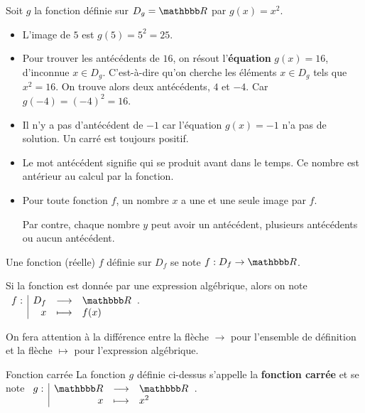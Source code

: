 \documentclass[10pt,a4paper,openany,twoside,prof]{book}
\begin{document}
\begin{ex}{}{}
    Soit $g$ la fonction définie sur $D_g=\R$ par $g(x)=x^2$.
    \begin{itemize}
        \item  L'image de $5$ est $g(5)=5^2=25$.
        \item  Pour trouver les antécédents de $16$, on résout l'\textbf{équation} $g(x)=16$, d'inconnue $x\in D_g$. C'est-à-dire qu'on cherche les éléments $x\in D_g$ tels que $x^2=16$. On trouve alors deux antécédents, $4$ et $-4$. Car $g(-4)=(-4)^2=16$.
        \item  Il n'y a pas d'antécédent de $-1$ car l'équation $g(x)=-1$ n'a pas de solution. Un carré est toujours positif.
    \end{itemize}
\end{ex}

\begin{rems}{}{}
    \begin{itemize}
        \item
        Le mot \og antécédent \fg{} signifie \og qui se produit avant dans le temps. Ce nombre est antérieur au calcul par la fonction.
        \item
        Pour toute fonction $f$, un nombre $x$ a une et une seule image par $f$.

        Par contre, chaque nombre $y$ peut avoir un antécédent, plusieurs antécédents ou aucun antécédent.
    \end{itemize}

\end{rems}

\begin{notation}{}{}
    Une fonction (réelle) $f$ définie sur $D_f$ se note $f:D_f\rightarrow\R$.

    Si la fonction est donnée par une expression algébrique, alors on note $\fonction{f}{D_f}{\R}{x}{f(x)}$.

    On fera attention à la différence entre la flèche $\rightarrow$ pour l'ensemble de définition et la flèche $\mapsto$ pour l'expression algébrique.
\end{notation}

\begin{defi}{Fonction carrée}{}
    La fonction $g$ définie ci-dessus s'appelle la \textbf{fonction carrée} et se note $\fonction{g}{\R}{\R}{x}{x^2}$.
\end{defi}
\end{document}
